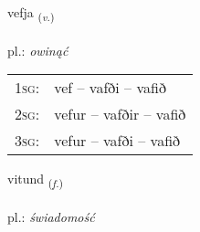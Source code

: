 \documentclass[frontgrid, backgrid]{flacards}\usepackage[]{graphicx}\usepackage[]{xcolor}
\begin{document}
\renewcommand{\flhead}{\vskip5pt \fboxsep=0pt {\small\bfseries\footnotesize Sagnorð | czasownik}}
\renewcommand{\fcfoot}{\vskip5pt \fboxsep=0pt \hspace{2pt}{\small\bfseries\footnotesize 3K}}

\renewcommand{\blhead}{\vskip5pt {\small\bfseries\footnotesize Sagnorð | czasownik }}
\renewcommand{\bcfoot}{\vskip5pt \hspace{2pt}{\small\bfseries\footnotesize 3K}}


{vefja \small{\textsubscript{(\textit{v.})}} \\[1ex] %
\textphonetic{[vɛvja]} \\
pl.: \emph{owinąć} \\  [2ex]
\renewcommand*{\arraystretch}{0.8}
\begin{tabular}{p{1cm}l}
\textsc{1sg}: & vef -- vafði -- vafið \\ 
\textsc{2sg}: & vefur -- vafðir -- vafið \\ 
\textsc{3sg}: & vefur -- vafði -- vafið \\ 
\end{tabular}
}

\renewcommand{\flhead}{\vskip5pt \fboxsep=0pt {\small\bfseries\footnotesize Nafnorð | rzeczownik}}
\renewcommand{\fcfoot}{\vskip5pt \fboxsep=0pt \hspace{2pt}{\small\bfseries\footnotesize 3K}}

\renewcommand{\blhead}{\vskip5pt {\small\bfseries\footnotesize Nafnorð | rzeczownik }}
\renewcommand{\bcfoot}{\vskip5pt \hspace{2pt}{\small\bfseries\footnotesize 3K}}


{vitund \small{\textsubscript{(\textit{f.})}} \\[1ex] %
\textphonetic{[vɪːtʏnt]} \\
pl.: \emph{świadomość} \\  [2ex]
\renewcommand*{\arraystretch}{0.8}
}
\end{document}
